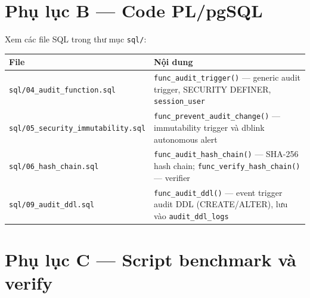 \section*{Phụ lục B --- Code PL/pgSQL}

Xem các file SQL trong thư mục \texttt{sql/}:

\begin{center}
\label{tab:code-files}
\begin{tabularx}{\textwidth}{l>{\raggedright\arraybackslash}X}
\toprule
\textbf{File} & \textbf{Nội dung} \\
\midrule
\texttt{sql/04\_audit\_function.sql} & \texttt{func\_audit\_trigger()} --- generic audit trigger, SECURITY DEFINER, \texttt{session\_user} \\
\texttt{sql/05\_security\_immutability.sql} & \texttt{func\_prevent\_audit\_change()} --- immutability trigger và dblink autonomous alert \\
\texttt{sql/06\_hash\_chain.sql} & \texttt{func\_audit\_hash\_chain()} --- SHA-256 hash chain; \texttt{func\_verify\_hash\_chain()} --- verifier \\
\texttt{sql/09\_audit\_ddl.sql} & \texttt{func\_audit\_ddl()} --- event trigger audit DDL (CREATE/ALTER), lưu vào \texttt{audit\_ddl\_logs} \\
\bottomrule
\end{tabularx}
\end{center}

\section*{Phụ lục C --- Script benchmark và verify}


